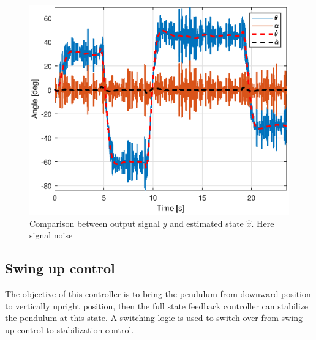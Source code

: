 \documentclass[superscriptaddress,floatfix,reprint,amssymb, amsmath,aps, pre]{revtex4-1}
\begin{document}
{{{            \begin{figure}
                \includegraphics[width = \linewidth]{EstimateState.eps}
                \caption{Comparison between output signal \(y\) and estimated state \(\hat x\). Here signal noise }
                \label{fig:EstimateState}
            \end{figure}
        }
        \subsection{Swing up control}{
            The objective of this controller is to bring the pendulum from downward position to vertically upright position, then the full state feedback controller can stabilize the pendulum at this state. A switching logic is used to switch over from swing up control to stabilization control. 

}}}
\end{document}

